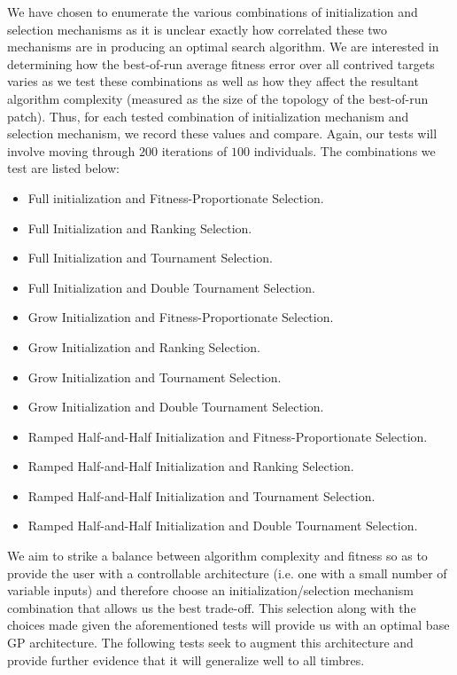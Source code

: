 \documentclass[a4paper,12pt]{report} 	%
\numberwithin{figure}{chapter}
\numberwithin{table}{chapter}
\numberwithin{equation}{chapter}
\begin{document}
\begin{flushleft}
We have chosen to enumerate the various combinations of initialization and selection mechanisms as it is unclear exactly how correlated these two mechanisms are in producing an optimal search algorithm. We are interested in determining how the best-of-run average fitness error over all contrived targets varies as we test these combinations as well as how they affect the resultant algorithm complexity (measured as the size of the topology of the best-of-run patch). Thus, for each tested combination of initialization mechanism and selection mechanism, we record these values and compare. Again, our tests will involve moving through $200$ iterations of $100$ individuals. The combinations we test are listed below:
\begin{itemize}
\item Full initialization and Fitness-Proportionate Selection.
\item Full Initialization and Ranking Selection.
\item Full Initialization and Tournament Selection.
\item Full Initialization and Double Tournament Selection.
\item Grow Initialization and Fitness-Proportionate Selection.
\item Grow Initialization and Ranking Selection.
\item Grow Initialization and Tournament Selection.
\item Grow Initialization and Double Tournament Selection.
\item Ramped Half-and-Half Initialization and Fitness-Proportionate Selection.
\item Ramped Half-and-Half Initialization and Ranking Selection.
\item Ramped Half-and-Half Initialization and Tournament Selection.
\item Ramped Half-and-Half Initialization and Double Tournament Selection.
\end{itemize}
We aim to strike a balance between algorithm complexity and fitness so as to provide the user with a controllable architecture (i.e. one with a small number of variable inputs) and therefore choose an initialization/selection mechanism combination that allows us the best trade-off. This selection along with the choices made given the aforementioned tests will provide us with an optimal base GP architecture. The following tests seek to augment this architecture and provide further evidence that it will generalize well to all timbres.


\end{flushleft}
\end{document}

